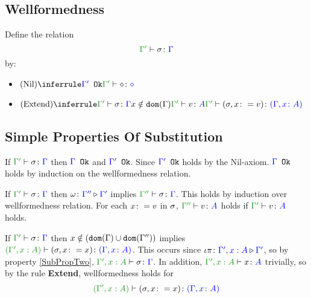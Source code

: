 \documentclass{report}
\begin{document}
\subsection{Wellformedness}
Define the relation $$\typerelation{\G'}{\si}{\G}$$ by:

\begin{itemize}
    \item $\ntreeruleI{Nil}{\ok{\G'}}{\typerelation{\G'}{\nil}{\nil}}$
    \item $\ntreeruleIII{Extend}{
        \typerelation{\G'}{\si}{\G}
        }{
        x\notin\dom{\G}
        }{
        \typerelation{\G'}{v}{A}
    }{
        \typerelation{\G'}{(\si, x \setto v)}{(\gax)}
    }$
\end{itemize}
\subsection{Simple Properties Of Substitution}

\begin{property}[Ok Relation]\label{SubPropOne}
    If $\typerelation{\G'}{\si}{\G}$ then  ${\color{blue} \Gamma} \texttt{ Ok}$ and ${\color{blue} \Gamma'} \texttt{ Ok}$. Since ${\color{blue} \Gamma'} \texttt{ Ok}$ holds by the Nil-axiom. ${\color{blue} \Gamma} \texttt{ Ok}$ holds by induction on the wellformedness relation.
\end{property}

\begin{property}[Weakening]\label{SubPropTwo}
    If $\typerelation{\G'}{\si}{\G}$ then $\omega \colon {\color{blue}\Gamma''} \triangleright {\color {blue} \Gamma'}$ implies $\typerelation{\G''}{\si}{\G}$.
    This holds by induction over wellformedness relation. For each $x\colon= v$ in $\sigma$, $\typerelation{\G''}{v}{A}$ holds if $\typerelation{\G'}{v}{A}$ holds.
\end{property}

\begin{property}[Extension]\label{SubPropThree}
    If $\typerelation{\G'}{\si}{\G}$ then $x \notin (\texttt{dom}(\Gamma) \cup \texttt{dom}(\Gamma''))$ implies $\typerelation{(\G', x: A)}{(\si, x \setto x)}{(\gax)}$.
    This occurs since $\iota\pi \colon {\color{blue}\Gamma',x: A} \triangleright {\color {blue} \Gamma'}$, so by property \ref{SubPropTwo}, 
    $\typerelation{\G', x: A}{\si}{\G}$.
    In addition, $\typerelation{\G', x: A}{x}{A}$ trivially, so by the rule \textbf{Extend}, wellformedness holds for
    \begin{equation}
        \typerelation{(\G', x:A)}{(\si, x\setto x)}{(\gax)}
    \end{equation}
\end{property}

     
    
\end{document}
